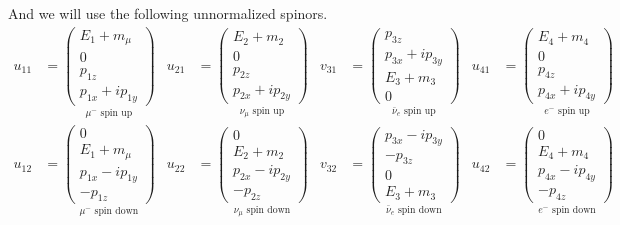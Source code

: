 \documentclass[12pt]{article}
\begin{document}
And we will use the following unnormalized spinors.
\begin{align*}
u_{11}&=
\underset{\text{$\mu^-$ spin up}}
{
\begin{pmatrix}E_1+m_\mu\\0\\p_{1z}\\p_{1x}+ip_{1y}\end{pmatrix}
}
&
u_{21}&=
\underset{\text{$\nu_\mu$ spin up}}
{
\begin{pmatrix}E_2+m_2\\0\\p_{2z}\\p_{2x}+ip_{2y}\end{pmatrix}
}
&
v_{31}&=
\underset{\text{$\bar{\nu}_e$ spin up}}
{
\begin{pmatrix}p_{3z}\\p_{3x}+ip_{3y}\\E_3+m_3\\0\end{pmatrix}
}
&
u_{41}&=
\underset{\text{$e^-$ spin up}}
{
\begin{pmatrix}E_4+m_4\\0\\p_{4z}\\p_{4x}+ip_{4y}\end{pmatrix}
}
\\[1ex]
u_{12}&=
\underset{\text{$\mu^-$ spin down}}
{
\begin{pmatrix}0\\E_1+m_\mu\\p_{1x}-ip_{1y}\\-p_{1z}\end{pmatrix}
}
&
u_{22}&=
\underset{\text{$\nu_\mu$ spin down}}
{
\begin{pmatrix}0\\E_2+m_2\\p_{2x}-ip_{2y}\\-p_{2z}\end{pmatrix}
}
&
v_{32}&=
\underset{\text{$\bar{\nu}_e$ spin down}}
{
\begin{pmatrix}p_{3x}-ip_{3y}\\-p_{3z}\\0\\E_3+m_3\end{pmatrix}
}
&
u_{42}&=
\underset{\text{$e^-$ spin down}}
{
\begin{pmatrix}0\\E_4+m_4\\p_{4x}-ip_{4y}\\-p_{4z}\end{pmatrix}
}
\end{align*}
\end{document}

